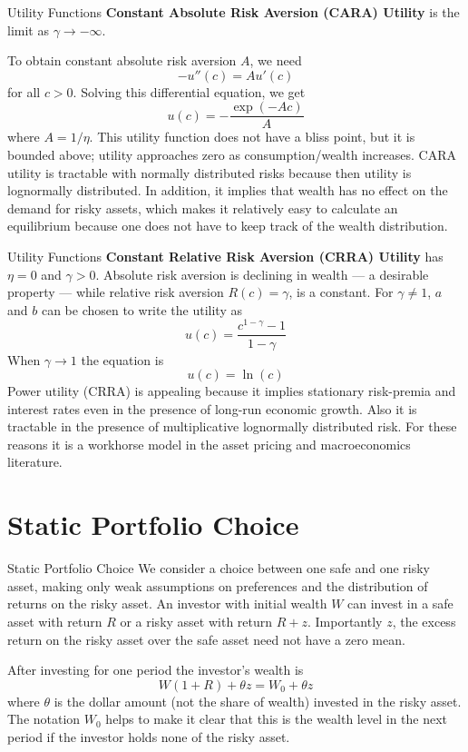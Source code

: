 \documentclass[aspectratio=169,xcolor=dvipsnames]{beamer}
\begin{document}
\begin{frame}{Utility Functions}
    \textbf{Constant Absolute Risk Aversion (CARA) Utility} is the limit as $\gamma \to -\infty$.

    To obtain constant absolute risk aversion $A$, we need
    \[
        -u''(c) = A u'(c)
    \]
    for all $c > 0$. Solving this differential equation, we get
    \[
        u(c) = -\frac{\exp(-Ac)}{A}
    \]
    where $A = 1/\eta$. This utility function does not have a bliss point, but it is bounded above; utility approaches zero as consumption/wealth increases. CARA utility is tractable with normally distributed risks because then utility is lognormally distributed. In addition, it implies that wealth has no effect on the demand for risky assets, which makes it relatively easy to calculate an equilibrium because one does not have to keep track of the wealth distribution.
\end{frame}

\begin{frame}{Utility Functions}
    \textbf{Constant Relative Risk Aversion (CRRA) Utility} has $\eta = 0$ and $\gamma > 0$. Absolute risk aversion is declining in wealth --- a desirable property --- while relative risk aversion $R(c) = \gamma$, is a constant. For $\gamma \neq 1$, $a$ and $b$ can be chosen to write the utility as
    \[
        u(c) = \frac{c^{1-\gamma} - 1}{1 - \gamma}
    \]
    When $\gamma \to 1$ the equation is
    \[
        u(c) = \ln(c)
    \]
    Power utility (CRRA) is appealing because it implies stationary risk-premia and interest rates even in the presence of long-run economic growth. Also it is tractable in the presence of multiplicative lognormally distributed risk. For these reasons it is a workhorse model in the asset pricing and macroeconomics literature.
\end{frame}

\section{Static Portfolio Choice}

\begin{frame}{Static Portfolio Choice}
    We consider a choice between one safe and one risky asset, making only weak assumptions on preferences and the distribution of returns on the risky asset. An investor with initial wealth $W$ can invest in a safe asset with return $R$ or a risky asset with return $R + z$. Importantly $z$, the excess return on the risky asset over the safe asset need not have a zero mean.

    After investing for one period the investor's wealth is
    \[
        W(1 + R) + \theta z = W_0 + \theta z
    \]
    where $\theta$ is the dollar amount (not the share of wealth) invested in the risky asset. The notation $W_0$ helps to make it clear that this is the wealth level in the next period if the investor holds none of the risky asset.
\end{frame}
\end{document}
